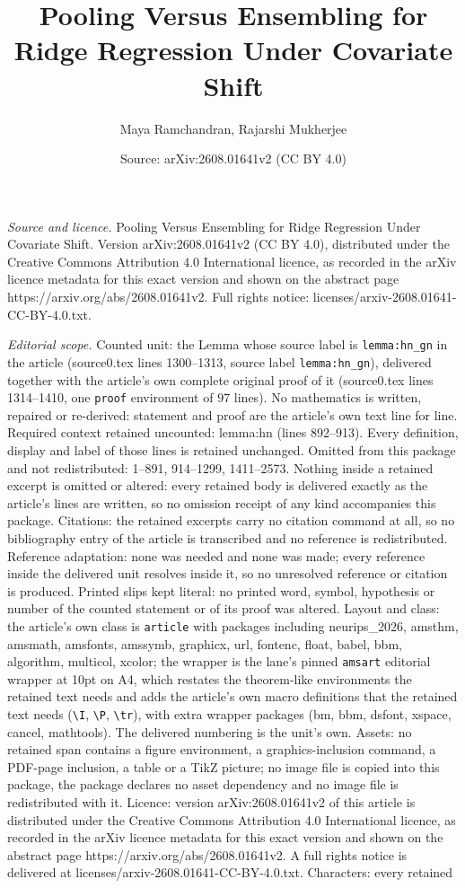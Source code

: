 \documentclass[10pt,a4paper]{amsart}
\title[Pooling Versus Ensembling for Ridge Regression Under Covaria]{Pooling Versus Ensembling for Ridge Regression Under Covariate Shift}
\author{Maya Ramchandran, Rajarshi Mukherjee}
\date{Source: arXiv:2608.01641v2 (CC BY 4.0)}
\begin{document}
\maketitle

\noindent\emph{Source and licence.} Pooling Versus Ensembling for Ridge Regression Under Covariate Shift. Version arXiv:2608.01641v2 (CC BY 4.0), distributed under the Creative Commons Attribution 4.0 International licence, as recorded in the arXiv licence metadata for this exact version and shown on the abstract page https://arxiv.org/abs/2608.01641v2. Full rights notice: licenses/arxiv-2608.01641-CC-BY-4.0.txt.\par\smallskip

\noindent\textit{Editorial scope.} Counted unit: the Lemma whose source label is \texttt{lemma:hn\_gn} in the article (source0.tex lines 1300--1313, source label \texttt{lemma:hn\_gn}), delivered together with the article's own complete original proof of it (source0.tex lines 1314--1410, one \texttt{proof} environment of 97 lines). No mathematics is written, repaired or re-derived: statement and proof are the article's own text line for line. Required context retained uncounted: lemma:hn (lines 892--913). Every definition, display and label of those lines is retained unchanged. Omitted from this package and not redistributed: 1--891, 914--1299, 1411--2573. Nothing inside a retained excerpt is omitted or altered: every retained body is delivered exactly as the article's lines are written, so no omission receipt of any kind accompanies this package. Citations: the retained excerpts carry no citation command at all, so no bibliography entry of the article is transcribed and no reference is redistributed. Reference adaptation: none was needed and none was made; every reference inside the delivered unit resolves inside it, so no unresolved reference or citation is produced. Printed slips kept literal: no printed word, symbol, hypothesis or number of the counted statement or of its proof was altered. Layout and class: the article's own class is \texttt{article} with packages including neurips\_2026, amsthm, amsmath, amsfonts, amssymb, graphicx, url, fontenc, float, babel, bbm, algorithm, multicol, xcolor; the wrapper is the lane's pinned \texttt{amsart} editorial wrapper at 10pt on A4, which restates the theorem-like environments the retained text needs and adds the article's own macro definitions that the retained text needs (\texttt{\textbackslash I}, \texttt{\textbackslash P}, \texttt{\textbackslash tr}), with extra wrapper packages (bm, bbm, dsfont, xspace, cancel, mathtools). The delivered numbering is the unit's own. Assets: no retained span contains a figure environment, a graphics-inclusion command, a PDF-page inclusion, a table or a TikZ picture; no image file is copied into this package, the package declares no asset dependency and no image file is redistributed with it. Licence: version arXiv:2608.01641v2 of this article is distributed under the Creative Commons Attribution 4.0 International licence, as recorded in the arXiv licence metadata for this exact version and shown on the abstract page https://arxiv.org/abs/2608.01641v2. A full rights notice is delivered at licenses/arxiv-2608.01641-CC-BY-4.0.txt. Characters: every retained 
\end{document}

